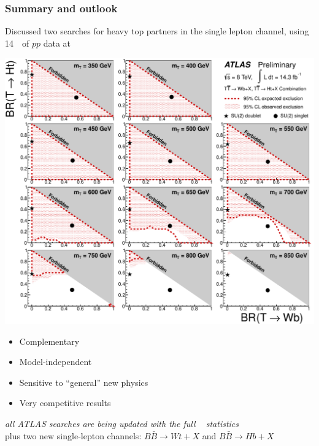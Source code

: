 
\begin{frame}\frametitle{Summary and outlook}
\footnotesize\centering

\begin{minipage}{.7\textwidth}\centering

Discussed two searches for heavy top partners in the single lepton channel, using 14~\ifb\ of $pp$ data at ~\tev

\myskip

\begin{minipage}{.4\textwidth}\centering

\includegraphics[width=.9\textwidth]{pics/combo/lim_Scan2D_comb.pdf}

\end{minipage}\begin{minipage}{.5\textwidth}\centering

\begin{itemize}
\item Complementary
\item Model-independent
\item Sensitive to ``general'' new physics
\item Very competitive results
\end{itemize}

\end{minipage}


\end{minipage}

{\it all ATLAS searches are being updated with the full {~\ifb} statistics}\\ plus two new single-lepton channels: $B\bar{B}\to Wt+X$ and $B\bar{B}\to Hb+X$

\end{frame}



